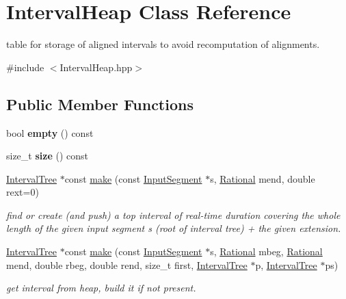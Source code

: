 \hypertarget{classIntervalHeap}{}\section{Interval\+Heap Class Reference}
\label{classIntervalHeap}


table for storage of aligned intervals to avoid recomputation of alignments.  




{\ttfamily \#include $<$Interval\+Heap.\+hpp$>$}

\subsection*{Public Member Functions}
\begin{DoxyCompactItemize}
\item 
bool {\bfseries empty} () const
\item 
size\+\_\+t {\bfseries size} () const
\item 
\mbox{\hyperlink{classIntervalTree}{Interval\+Tree}} $\ast$const \mbox{\hyperlink{group__segment_gad7fd7dd4ddb8d520df0985e67d180019}{make}} (const \mbox{\hyperlink{classInputSegment}{Input\+Segment}} $\ast$s, \mbox{\hyperlink{classRational}{Rational}} mend, double rext=0)
\begin{DoxyCompactList}\small\item\em find or create (and push) a top interval of real-\/time duration covering the whole length of the given input segment s (root of interval tree) + the given extension. \end{DoxyCompactList}\item 
\mbox{\hyperlink{classIntervalTree}{Interval\+Tree}} $\ast$const \mbox{\hyperlink{group__segment_gad886d53d2881a80f06c6f9fbf202d727}{make}} (const \mbox{\hyperlink{classInputSegment}{Input\+Segment}} $\ast$s, \mbox{\hyperlink{classRational}{Rational}} mbeg, \mbox{\hyperlink{classRational}{Rational}} mend, double rbeg, double rend, size\+\_\+t first, \mbox{\hyperlink{classIntervalTree}{Interval\+Tree}} $\ast$p, \mbox{\hyperlink{classIntervalTree}{Interval\+Tree}} $\ast$ps)
\begin{DoxyCompactList}\small\item\em get interval from heap, build it if not present. \end{DoxyCompactList}\end{DoxyCompactItemize}
